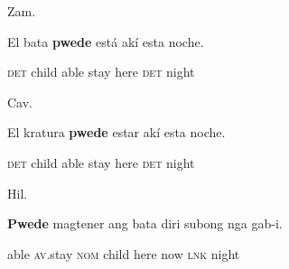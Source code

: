 \begin{listWWNumiileveli}
\item 
\begin{listWWNumiilevelii}
\item 
\begin{stylelsLanginfo}
Zam.
\end{stylelsLanginfo}
\end{listWWNumiilevelii}
\end{listWWNumiileveli}
\begin{stylelsSourceline}
El bata \textbf{pwede }est\'{a} ak\'{i} esta noche.
\end{stylelsSourceline}

\begin{stylelsIMT}
\textsc{det }child able stay here \textsc{det }night
\end{stylelsIMT}

\begin{listWWNumiileveli}
\item 
\begin{listWWNumiilevelii}
\item 
\begin{stylelsLanginfo}
Cav.
\end{stylelsLanginfo}
\end{listWWNumiilevelii}
\end{listWWNumiileveli}
\begin{stylelsSourceline}
El kratura \textbf{pwede} estar ak\'{i} esta noche.
\end{stylelsSourceline}

\begin{stylelsIMT}
\textsc{det }child able stay here \textsc{det} night
\end{stylelsIMT}

\begin{listWWNumiileveli}
\item 
\begin{listWWNumiilevelii}
\item 
\begin{stylelsLanginfo}
Hil.
\end{stylelsLanginfo}
\end{listWWNumiilevelii}
\end{listWWNumiileveli}
\begin{stylelsSourceline}
\textbf{Pwede} magtener ang bata diri subong nga gab-i.
\end{stylelsSourceline}

\begin{stylelsSourceline}
\textup{able }\textsc{av}\textup{.stay}\textup{ }\textsc{nom}\textup{ child here now}\textup{ }\textsc{lnk}\textup{ night}
\end{stylelsSourceline}

